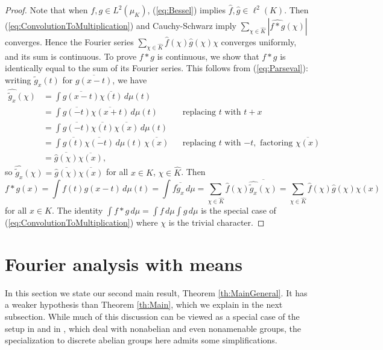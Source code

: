 \documentclass[12pt]{amsart} \usepackage{amsmath,centernot,amssymb,leftindex}
\numberwithin{theorem}{section}
\numberwithin{equation}{section}
\theoremstyle{definition}
\begin{document}
\begin{proof}  Note that when $f,g\in L^2(\mu_K)$, (\ref{eq:Bessel}) implies $\hat{f},\hat{g}\in \ell^{2}(K)$.  Then (\ref{eq:ConvolutionToMultiplication}) and Cauchy-Schwarz imply $\sum_{\chi\in\widehat{K}}|\widehat{f*g}(\chi)|$ converges.  Hence the Fourier series $\sum_{\chi\in\widehat{K}} \hat{f}(\chi)\hat{g}(\chi)\chi$ converges uniformly, and its sum is continuous.  To prove $f*g$ is continuous,  we show that $f*g$ is identically equal to the sum of its Fourier series. This follows from (\ref{eq:Parseval}): writing $\tilde{g}_x(t)$ for $\overline{g(x-t)}$, we have  
\begin{align*}
\widehat{\tilde{g}_x}(\chi)&= \int \overline{g(x-t)}\overline{\chi(t)}\, d\mu(t)\\
&= \int \overline{g(-t)} \overline{\chi(x+t)}\, d\mu(t)  && \text{replacing $t$ with $t+x$}\\
&= \int \overline{g(-t)}\overline{\chi(t)} \overline{\chi(x)}\, d\mu(t)  \\
&= \int \overline{g(t)}\overline{\chi(-t)} \, d\mu(t)\, \overline{\chi(x)} && \text{replacing $t$ with $-t$}, \text{ factoring $\overline{\chi(x)}$}\\
&= \overline{\hat{g}(\chi)} \overline{\chi(x)},
\end{align*}
so $\widehat{\tilde{g}_x}(\chi)=\overline{\hat{g}(\chi)} \overline{\chi(x)}$
for all $x\in K$, $\chi\in\widehat{K}$. Then 
\begin{equation}\label{eq:ConvolutionExpansion}
f*g(x) =	\int f(t) g(x-t)\, d\mu(t) = \int f \overline{\tilde{g}_{x}}\, d\mu = \sum_{\chi\in\widehat{K}} \hat{f}(\chi)\overline{\widehat{\tilde{g}_x}(\chi)}=\sum_{\chi\in\widehat{K}} \hat{f}(\chi)\hat{g}(\chi)\chi(x)
\end{equation}
for all $x\in K$.	 The identity $\int f*g\, d\mu = \int f\, d\mu \int g\, d\mu$ is the special case of (\ref{eq:ConvolutionToMultiplication}) where $\chi$ is the trivial character. \end{proof}
	




	
	
\section{Fourier analysis with means}
In this section we state our second main result, Theorem \ref{th:MainGeneral}.   It has a weaker hypothesis than Theorem \ref{th:Main}, which we explain in the next subsection.  While much of this discussion can be viewed as a special case of the setup in \cite{BjorklundFish_ProductSet} and in \cite{Bjorklund_ProductSetMeasured}, which deal with nonabelian and even nonamenable groups, the specialization to discrete abelian groups here admits some simplifications.
	
\end{document}
